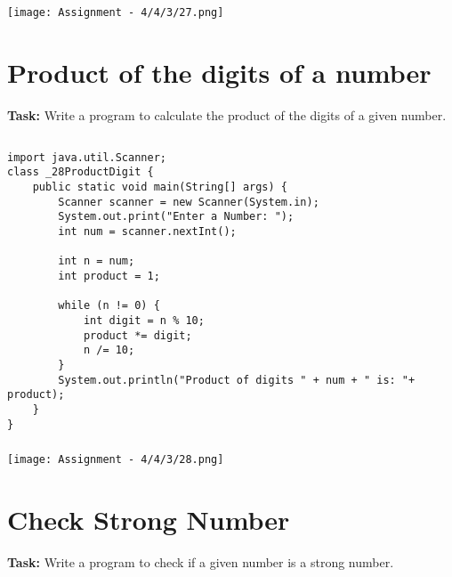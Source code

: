 \documentclass[12pt,a4paper]{article}
\begin{document}
\subsubsection{}
\begin{center}
    \texttt{[image: Assignment - 4/4/3/27.png]}
\end{center}


\section{Product of the digits of a number}
\textbf{Task:} Write a program to calculate the product of the digits of a given number.

\subsection{}
\begin{lstlisting}
import java.util.Scanner;
class _28ProductDigit {
    public static void main(String[] args) {
        Scanner scanner = new Scanner(System.in);
        System.out.print("Enter a Number: ");
        int num = scanner.nextInt();
    
        int n = num;
        int product = 1;
    
        while (n != 0) {
            int digit = n % 10;
            product *= digit;
            n /= 10;
        }
        System.out.println("Product of digits " + num + " is: "+ product);
    }
}
\end{lstlisting}

\subsubsection{}
\begin{center}
    \texttt{[image: Assignment - 4/4/3/28.png]}
\end{center}


\section{Check Strong Number}
\textbf{Task:} Write a program to check if a given number is a strong number.
\end{document}
